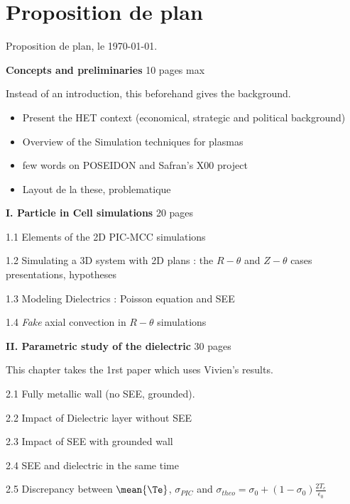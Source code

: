



\chapter*{Proposition de plan}

Proposition de plan, le \today.
\linebreak

{\bf Concepts and preliminaries} 10 pages max
\begin{zzz}
  Instead of an introduction, this beforehand gives the background.
  \begin{itemize}
    \item Present the HET context (economical, strategic and political background)
    \item Overview of the Simulation techniques for plasmas
    \item few words on POSEIDON and Safran's X00 project
    \item Layout de la these, problematique
  \end{itemize}
\end{zzz}

{\bf I. Particle in Cell simulations} 20 pages
\begin{zzz}
  1.1 Elements of the 2D PIC-MCC simulations

  1.2 Simulating a 3D system with 2D plans : the {\bf $R-\theta$} and {\bf $Z-\theta$} cases presentations, hypotheses

  1.3 Modeling Dielectrics : Poisson equation and SEE

  1.4 {\it Fake} axial convection in {\bf $R-\theta$} simulations
\end{zzz}

{\bf II. Parametric study of the dielectric} 30 pages
\begin{zzz}
  This chapter takes the 1rst paper which uses Vivien's results.

  2.1 Fully metallic wall (no SEE, grounded).

  2.2 Impact of Dielectric layer without SEE

  2.3 Impact of SEE with grounded wall

  2.4 SEE and dielectric in the same time

  2.5 Discrepancy between $\mean{\Te}$, $\sigma_{PIC}$ and $\sigma_{theo} = \sigma_0 + (1 - \sigma_0) \frac{2 T_e}{\epsilon_0}$
\end{zzz}

